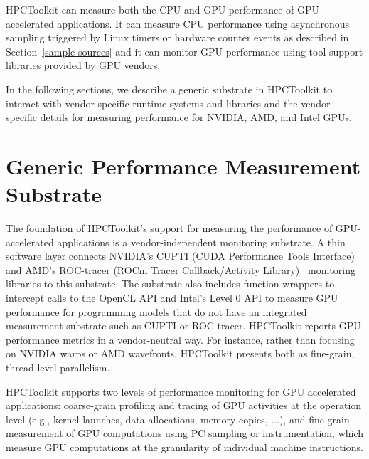 HPCToolkit can measure both the CPU and GPU performance of GPU-accelerated applications. It can measure CPU performance using asynchronous sampling triggered by Linux timers or hardware counter events as described in 
Section~\ref{sample-sources} and it can monitor GPU performance using tool support libraries provided by GPU vendors.

In the following sections, we describe a generic substrate in HPCToolkit to interact with vendor specific runtime systems and libraries and the vendor specific details for measuring performance for NVIDIA, AMD, and Intel GPUs. 

\section{Generic Performance Measurement Substrate}

The foundation of HPCToolkit's support for measuring the performance of GPU-accelerated applications is a vendor-independent monitoring substrate. A thin software layer connects NVIDIA's CUPTI (CUDA Performance Tools Interface)~\cite{cupti} and AMD's ROC-tracer (ROCm Tracer Callback/Activity Library)~\cite{roctracer} monitoring libraries to this substrate. The substrate also includes function wrappers to intercept calls to the OpenCL API and Intel's Level 0 API to measure GPU performance for programming models that do not have an integrated measurement substrate 
such as CUPTI or ROC-tracer. 
HPCToolkit reports GPU performance metrics in a vendor-neutral way. For instance, rather than focusing on NVIDIA warps or AMD wavefronts, HPCToolkit presents both as fine-grain, thread-level parallelism.

HPCToolkit supports two levels of performance monitoring for GPU accelerated applications: coarse-grain profiling and tracing of GPU activities at the operation level (e.g., kernel launches, data allocations, memory copies, ...), and fine-grain measurement of GPU computations using PC sampling or instrumentation, which measure GPU computations at the granularity of individual machine instructions.

